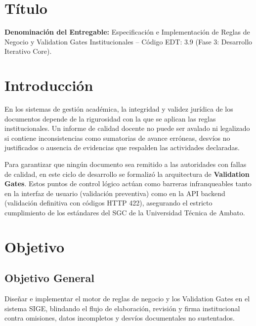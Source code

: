 \documentclass[12pt,a4paper]{article}
\begin{document}

\vspace{0.25cm}
\section{Título}
\textbf{Denominación del Entregable:} Especificación e Implementación de Reglas de Negocio y Validation Gates Institucionales -- Código EDT: 3.9 (Fase 3: Desarrollo Iterativo Core).

\section{Introducción}
En los sistemas de gestión académica, la integridad y validez jurídica de los documentos depende de la rigurosidad con la que se aplican las reglas institucionales. Un informe de calidad docente no puede ser avalado ni legalizado si contiene inconsistencias como sumatorias de avance erróneas, desvíos no justificados o ausencia de evidencias que respalden las actividades declaradas.

Para garantizar que ningún documento sea remitido a las autoridades con fallas de calidad, en este ciclo de desarrollo se formalizó la arquitectura de \textbf{Validation Gates}. Estos puntos de control lógico actúan como barreras infranqueables tanto en la interfaz de usuario (validación preventiva) como en la API backend (validación definitiva con códigos HTTP 422), asegurando el estricto cumplimiento de los estándares del SGC de la Universidad Técnica de Ambato.

\section{Objetivo}

\subsection{Objetivo General}
Diseñar e implementar el motor de reglas de negocio y los Validation Gates en el sistema SIGE, blindando el flujo de elaboración, revisión y firma institucional contra omisiones, datos incompletos y desvíos documentales no sustentados.
\end{document}
